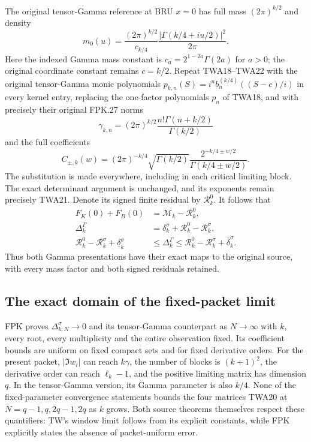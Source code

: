 The original tensor-Gamma reference at BRU $x=0$ has full mass
$(2\pi)^{k/2}$ and density
\[
m_0(u)=\frac{(2\pi)^{k/2}}{c_{k/4}}
                   \frac{|\Gamma(k/4+iu/2)|^2}{2\pi}.
\]
Here the indexed Gamma mass constant is
$c_a=2^{1-2a}\Gamma(2a)$ for $a>0$; the original coordinate
constant remains $c=k/2$.
Repeat TWA18--TWA22 with the original tensor-Gamma monic polynomials
$p_{k,n}(S)=i^n b_n^{(k/4)}((S-c)/i)$ in every kernel entry,
replacing the one-factor polynomials $p_n$ of TWA18, and with
precisely their original FPK.27 norms
\[
\gamma_{k,n}=(2\pi)^{k/2}
                   \frac{n!\Gamma(n+k/2)}{\Gamma(k/2)}
\]
and the full coefficients
\[
C_{\pm,k}(w)=(2\pi)^{-k/4}\sqrt{\Gamma(k/2)}
              \frac{2^{-k/4\pm w/2}}{\Gamma(k/4\pm w/2)}.
\]
The substitution is made everywhere, including in each critical
limiting block. The exact determinant argument is unchanged, and
its exponents remain precisely TWA21. Denote its signed finite
residual by $\mathcal R_k^0$. It follows that
\[
\boxed{\begin{aligned}
F_K(0)+F_B(0)&=\mathcal M_k-\mathcal R_k^0,\\
\Delta_k^\Gamma
&=\delta_k^\sigma+\mathcal R_k^0-\mathcal R_k^\sigma,\\
\mathcal R_k^0-\mathcal R_k^\sigma+\underline\delta_k^\sigma
&\leq\Delta_k^\Gamma
\leq\mathcal R_k^0-\mathcal R_k^\sigma+\overline\delta_k^\sigma.
\end{aligned}}\tag{TWA24}
\]
Thus both Gamma presentations have their exact maps to the original
source, with every mass factor and both signed residuals retained.

\subsection{The exact domain of the fixed-packet limit}

FPK proves $\Delta_{k,N}^\sigma\to0$ and its tensor-Gamma
counterpart as $N\to\infty$ with $k$, every root, every multiplicity
and the entire observation fixed. Its coefficient bounds are
uniform on fixed compact sets and for fixed derivative orders.
For the present packet, $|\Im w_i|$ can reach $k\gamma$, the
number of blocks is $(k+1)^2$, the derivative order can reach
$\ell_k-1$, and the positive limiting matrix has dimension $q$.
In the tensor-Gamma version, its Gamma parameter is also $k/4$.
None of the fixed-parameter convergence statements bounds the
four matrices TWA20 at $N=q-1,q,2q-1,2q$ as $k$ grows.
Both source theorems themselves respect these quantifiers: TW's
window limit follows from its explicit constants, while FPK
explicitly states the absence of packet-uniform error.

